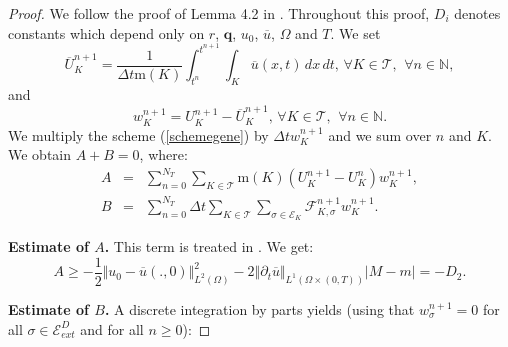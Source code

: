 \documentclass[smallextended]{svjour3}
\newcommand{\ds}{\displaystyle}
\def\pa{\partial}
\def\pa{\partial}
\begin{document}
\begin{proof}
We follow the proof of Lemma 4.2 in \cite{Eymard2006}. Throughout this proof, $D_{i}$ denotes constants which depend only on $r$, $\textbf{q}$, $u_{0}$, $\overline{u}$, $\Omega$ and $T$. We set
\begin{equation*}
\overline{U}^{n+1}_{K}=\ds{\frac{1}{\Delta t\text{m}(K)}\int_{t^{n}}^{t^{n+1}}\int_{K}\overline{u}(x,t)\, dx \, dt},\, \forall K \in \mathcal{T}, \,\ \forall n \in \mathbb{N},
\end{equation*} 
and
\begin{equation*}
w^{n+1}_{K}=U^{n+1}_{K}-\overline{U}^{n+1}_{K},\, \forall K \in \mathcal{T}, \,\ \forall n \in \mathbb{N}.
\end{equation*}
We multiply the scheme (\ref{schemegene}) by $\Delta t w^{n+1}_{K}$ and we sum over $n$ and $K$. We obtain $A+B=0$, where: 
\begin{eqnarray*}
A &=& \sum_{n=0}^{N_{T}}\sum_{K \in \mathcal{T}}\text{m}(K)\left(U^{n+1}_{K}-U^{n}_{K}\right)w_{K}^{n+1},\\
B &=& \sum_{n=0}^{N_{T}} \Delta t \sum_{K \in \mathcal{T}} \sum_{\sigma \in \mathcal{E}_{K}} \mathcal{F}^{n+1}_{K,\sigma}w^{n+1}_{K}.
\end{eqnarray*}

\textbf{Estimate of $A$.} This term is treated in \cite{Eymard2006}. We get:
\begin{equation}
A \geq -\frac{1}{2}\Vert u_{0}-\overline{u}(.,0)\Vert_{L^{2}(\Omega)}^{2}-2\Vert \pa_{t}\overline{u}\Vert_{L^{1}(\Omega \times (0,T))}|M-m| =-D_{2}. \label{estimA}
\end{equation}

\textbf{Estimate of $B$.} A discrete integration by parts yields (using that $w_{\sigma}^{n+1}=0$ for all $\sigma \in \mathcal{E}_{ext}^{D}$ and for all $n \geq 0$):


\end{proof}
\end{document}
